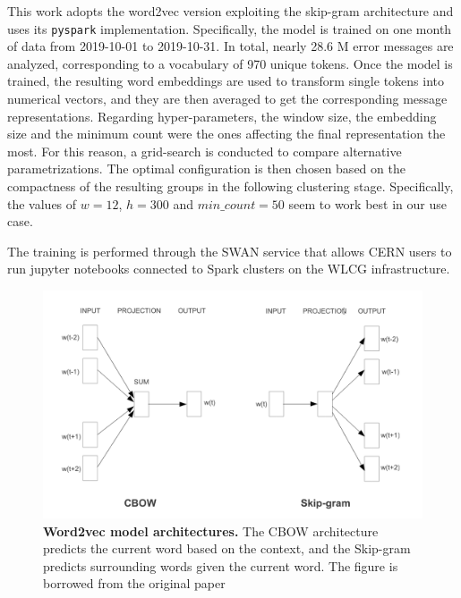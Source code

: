 This work adopts the word2vec version exploiting the skip-gram architecture and uses its \texttt{pyspark} implementation.
Specifically, the model is trained on one month of data from 2019-10-01 to 2019-10-31.
In total, nearly 28.6 M error messages are analyzed, corresponding to a vocabulary of 970 unique tokens.
Once the model is trained, the resulting word embeddings are used to transform single tokens into numerical vectors, and they are then averaged to get the corresponding message representations.
Regarding hyper-parameters, the window size, the embedding size and the minimum count were the ones affecting the final representation the most.
For this reason, a grid-search is conducted to compare alternative parametrizations.  
The optimal configuration is then chosen based on the compactness of the resulting groups in the following clustering stage.
Specifically, the values of $w=12$, $h=300$ and $min\_count=50$ seem to work best in our use case.

The training is performed through the SWAN service \cite{piparo2018swan} that allows CERN users to run jupyter notebooks connected to Spark \cite{zaharia2010spark} clusters on the WLCG infrastructure.

\begin{figure}
    \centering
    \includegraphics[width=\textwidth]{figures/410_method/word2vec.png}
    \caption{\textbf{Word2vec model architectures.} The CBOW architecture predicts the current word based on the
context, and the Skip-gram predicts surrounding words given the current word. The figure is borrowed from the original paper \protect \cite{mikolov2013word2vec}
}
    \label{fig:word2vec}
\end{figure}